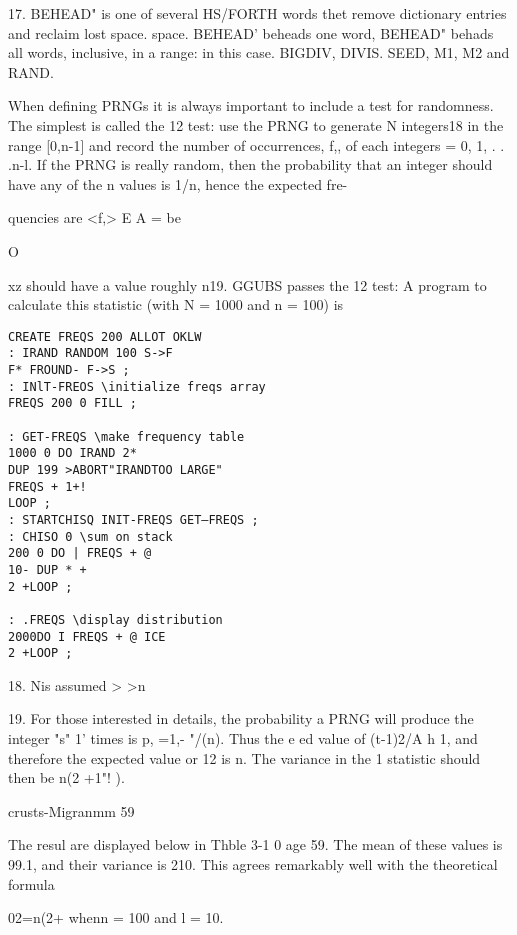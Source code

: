 17. BEHEAD" is one of several HS/FORTH words thet remove dictionary entries and reclaim lost space.
space. BEHEAD' beheads one word, BEHEAD" behads all words, inclusive, in a range: in this
case. BIGDIV, DIVIS. SEED, M1, M2 and RAND.



When defining PRNGs it is always important to include a test
for randomness. The simplest is called the 12 test: use the
PRNG to generate N integers18 in the range [0,n-1] and record
the number of occurrences, f,, of each integers = 0, 1, . . .n-l. If
the PRNG is really random, then the probability that an integer
should have any of the n values is 1/n, hence the expected fre-

quencies are <f,> E A = %
be


O

xz should have a value roughly n19. GGUBS passes the 12 test: A
program to calculate this statistic (with N = 1000 and n = 100) is

\begin{verbatim}
CREATE FREQS 200 ALLOT OKLW
: IRAND RANDOM 100 S->F
F* FROUND- F->S ;
: INlT-FREOS \initialize freqs array
FREQS 200 0 FILL ;

: GET-FREQS \make frequency table
1000 0 DO IRAND 2*
DUP 199 >ABORT"IRANDTOO LARGE"
FREQS + 1+!
LOOP ;
: STARTCHISQ INIT-FREQS GET—FREQS ;
: CHISO 0 \sum on stack
200 0 DO | FREQS + @
10- DUP * +
2 +LOOP ;

: .FREQS \display distribution
2000DO I FREQS + @ ICE
2 +LOOP ;

\end{verbatim}
 

18. Nis assumed > >n

19. For those interested in details, the probability a PRNG will produce the integer "s" 1' times is
p, =1,- "/(n). Thus the e ed value of (t-1)2/A h 1, and therefore the expected value or 12
is n. The variance in the 1 statistic should then be n(2 +1"! ).

crusts-Migranmm 59

The resul are displayed below in Thble 3-1 0 age 59. The mean
of these values is 99.1, and their variance is 210. This agrees
remarkably well with the theoretical formula

02=n(2+%
whenn = 100 and l = 10.

